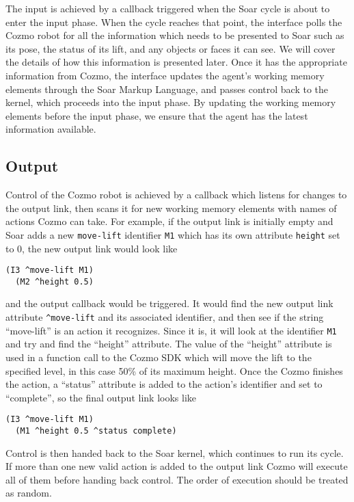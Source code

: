The input is achieved by a callback triggered when the Soar cycle is
about to enter the input phase. When the cycle reaches that point, the
interface polls the Cozmo robot for all the information which needs to
be presented to Soar such as its pose, the status of its lift, and any
objects or faces it can see. We will cover the details of how this
information is presented later. Once it has the appropriate information
from Cozmo, the interface updates the agent's working memory elements
through the Soar Markup Language, and passes control back to the kernel,
which proceeds into the input phase. By updating the working memory
elements before the input phase, we ensure that the agent has the latest
information available.

\hypertarget{output}{%
\subsection{Output}\label{output}}

Control of the Cozmo robot is achieved by a callback which listens for
changes to the output link, then scans it for new working memory
elements with names of actions Cozmo can take. For example, if the
output link is initially empty and Soar adds a new \texttt{move-lift}
identifier \texttt{M1} which has its own attribute \texttt{height} set
to 0, the new output link would look like

\begin{verbatim}
(I3 ^move-lift M1)
  (M2 ^height 0.5)
\end{verbatim}

and the output callback would be triggered. It would find the new output
link attribute \texttt{\^{}move-lift} and its associated identifier, and
then see if the string ``move-lift'' is an action it recognizes. Since
it is, it will look at the identifier \texttt{M1} and try and find the
``height'' attribute. The value of the ``height'' attribute is used in a
function call to the Cozmo SDK which will move the lift to the specified
level, in this case 50\% of its maximum height. Once the Cozmo finishes
the action, a ``status'' attribute is added to the action's identifier
and set to ``complete'', so the final output link looks like

\begin{verbatim}
(I3 ^move-lift M1)
  (M1 ^height 0.5 ^status complete)
\end{verbatim}

Control is then handed back to the Soar kernel, which continues to run
its cycle. If more than one new valid action is added to the output link
Cozmo will execute all of them before handing back control. The order of
execution should be treated as random.

